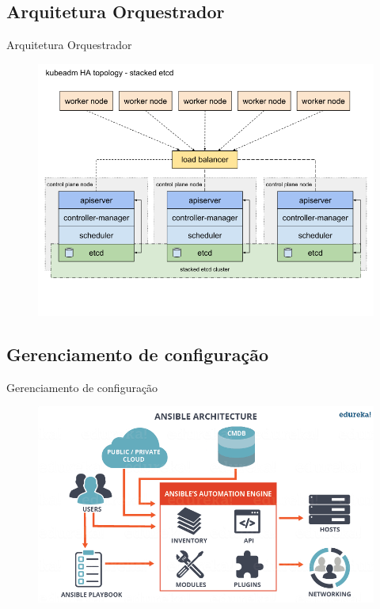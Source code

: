 \documentclass[10pt,brazil]{beamer}
\theoremstyle{definition}
\begin{document}
\subsection{Arquitetura Orquestrador}

\begin{frame}{Arquitetura Orquestrador}
\begin{figure}
    \centering
    \includegraphics[width=1\textwidth]{kubeadm-ha-topology-stacked-etcd.png}
    \label{fig:k8s-arch}
\end{figure}
\end{frame}
\subsection{Gerenciamento de configuração}

\begin{frame}{Gerenciamento de configuração}
      \begin{figure}
          \centering
      \includegraphics[width=.8\textwidth]{ansible arch.png}
          \label{fig:ansiblearch}
      \end{figure}
      
\end{frame}
\end{document}

